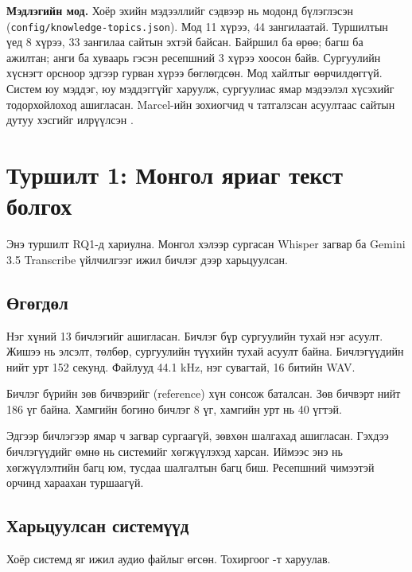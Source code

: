 \textbf{Мэдлэгийн мод.} Хоёр эхийн мэдээллийг сэдвээр нь модонд бүлэглэсэн (\texttt{config/\allowbreak knowledge-topics.json}). Мод 11 хүрээ, 44 зангилаатай. Туршилтын үед 8 хүрээ, 33 зангилаа сайтын эхтэй байсан. Байршил ба өрөө; багш ба ажилтан; анги ба хуваарь гэсэн ресепшний 3 хүрээ хоосон байв. Сургуулийн хүснэгт орсноор эдгээр гурван хүрээ бөглөгдсөн. Мод хайлтыг өөрчилдөггүй. Систем юу мэддэг, юу мэддэггүйг харуулж, сургуулиас ямар мэдээлэл хүсэхийг тодорхойлоход ашигласан. Marcel-ийн зохиогчид ч татгалзсан асуултаас сайтын дутуу хэсгийг илрүүлсэн \cite{trienes2025marcel}.

\section{Туршилт 1: Монгол яриаг текст болгох}
\label{sec:exp-stt}

Энэ туршилт RQ1-д хариулна. Монгол хэлээр сургасан Whisper загвар ба Gemini 3.5 Transcribe үйлчилгээг ижил бичлэг дээр харьцуулсан.

\subsection{Өгөгдөл}
\label{sec:stt-data}

Нэг хүний 13 бичлэгийг ашигласан. Бичлэг бүр сургуулийн тухай нэг асуулт. Жишээ нь элсэлт, төлбөр, сургуулийн түүхийн тухай асуулт байна. Бичлэгүүдийн нийт урт 152 секунд. Файлууд 44.1 kHz, нэг сувагтай, 16 битийн WAV.

Бичлэг бүрийн зөв бичвэрийг (reference) хүн сонсож баталсан. Зөв бичвэрт нийт 186 үг байна. Хамгийн богино бичлэг 8 үг, хамгийн урт нь 40 үгтэй.

Эдгээр бичлэгээр ямар ч загвар сургаагүй, зөвхөн шалгахад ашигласан. Гэхдээ бичлэгүүдийг өмнө нь системийг хөгжүүлэхэд харсан. Иймээс энэ нь хөгжүүлэлтийн багц юм, тусдаа шалгалтын багц биш. Ресепшний чимээтэй орчинд хараахан туршаагүй.

\subsection{Харьцуулсан системүүд}
\label{sec:stt-systems}

Хоёр системд яг ижил аудио файлыг өгсөн. Тохиргоог -т харуулав.

